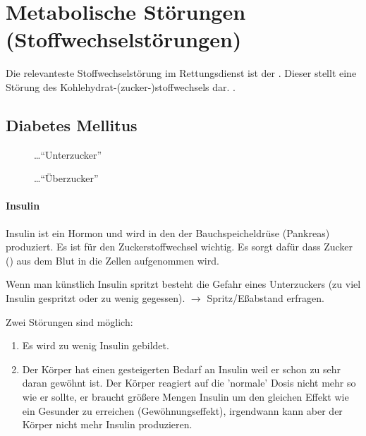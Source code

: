 \clearpage
\section{Metabolische Störungen (Stoffwechselstörungen)}

Die relevanteste Stoffwechselstörung im Rettungsdienst ist der
. Dieser
stellt eine Störung des Kohlehydrat-(zucker-)stoffwechsels dar.
. 

\subsection{Diabetes Mellitus}\label{topic:diabetes}


\begin{description}
\item[] \ldots "`Unterzucker"'

\item[] \ldots "`Überzucker"'

\end{description}

\paragraph{Insulin}

Insulin ist ein Hormon und wird in den 
der Bauchspeicheldrüse (Pankreas) produziert. Es ist für
den Zuckerstoffwechsel wichtig. Es sorgt dafür dass Zucker
() aus dem Blut in die Zellen aufgenommen wird.



Wenn man künstlich Insulin spritzt besteht die Gefahr eines
Unterzuckers (zu viel Insulin gespritzt oder zu wenig
gegessen). ${\rightarrow}$  Spritz/Eßabstand
er\-fra\-gen.


Zwei Störungen sind möglich:

\begin{enumerate}
    \item Es wird zu wenig Insulin gebildet.
    \item Der Körper hat einen gesteigerten Bedarf an Insulin weil er schon 
    zu sehr daran gewöhnt ist. Der Körper reagiert auf die 'normale' Dosis
    nicht mehr so wie er sollte, er braucht größere Mengen Insulin um
    den gleichen Effekt wie ein Gesunder zu erreichen (Gewöhnungseffekt),
    irgendwann kann aber der Körper nicht mehr Insulin produzieren.
\end{enumerate}

